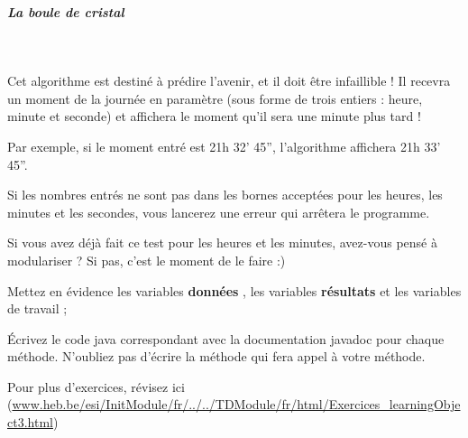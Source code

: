 \documentclass[11pt,a4paper]{article}
\begin{document}
			
		\subparagraph{La boule de cristal} 
		
					\textcolor{white}{.} \par
				
          Cet algorithme est destin\'e \`a pr\'edire l'avenir, et il doit \^etre infaillible ! 
          Il recevra un moment de la journ\'ee en param\`etre (sous forme  de trois entiers : heure, minute et seconde) et affichera le moment qu'il sera une minute plus tard ! 
        
            \par
        
          Par exemple, si le moment entr\'e est 21h 32' 45'', l'algorithme affichera 21h 33' 45''.
        
            \par
        
          Si les nombres entr\'es ne sont pas dans les bornes accept\'ees pour les heures, les minutes et les secondes, vous lancerez une erreur qui arr\^etera le programme. 
        
            \par
        
          Si vous avez d\'ej\`a fait ce test pour les heures et les minutes, avez-vous pens\'e \`a modulariser ? Si pas, c'est le moment de le faire :)
        
            \par
        
          Mettez en \'evidence les variables \textbf{\guillemotleft  donn\'ees \guillemotright }, 
          les variables \textbf{\guillemotleft  r\'esultats \guillemotright } et les variables de travail ;
        
            \par
        
          \'Ecrivez le code java correspondant avec la documentation javadoc pour chaque m\'ethode. 
          N'oubliez pas d'\'ecrire la m\'ethode \verb@main@ qui fera appel \`a votre m\'ethode.
        
            \par
        Pour plus d'exercices, 
        r\'evisez ici (\url{www.heb.be/esi/InitModule/fr/../../TDModule/fr/html/Exercices\_learningObject3.html})
            \par
        
				
\end{document}
